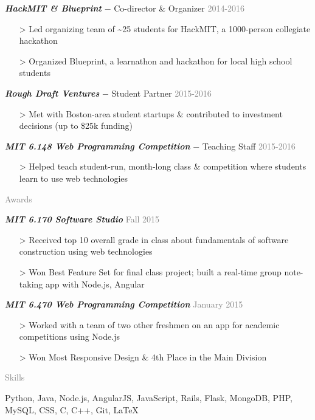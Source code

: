 \documentclass[11pt]{article}
\newcommand{\rsection}[1]{\vspace{1.5em}\textcolor{gray}{\Large \robotoslab #1}\vspace{0.5em}}
\newcommand{\bt}[1]{\textit{\textbf{#1}}} %
\newcommand{\gap}[0]{\vspace{0.4em}} %
\newcommand{\dash}[0]{ $-$ } %
\newcommand{\gray}[1]{\textcolor{gray}{#1}}
\newcommand{\e}[0]{> }
\begin{document}
\bt{HackMIT \& Blueprint}\dash Co-director \& Organizer \hfill \gray{2014-2016}

\begin{itemize}
\item[\e] Led organizing team of \textasciitilde 25 students for HackMIT, a 1000-person collegiate hackathon
\item[\e] Organized Blueprint, a learnathon and hackathon for local high school students
\end{itemize}

\gap

\bt{Rough Draft Ventures}\dash Student Partner \hfill \gray{2015-2016}

\begin{itemize}
\item[\e] Met with Boston-area student startups \& contributed to investment decisions (up to \$25k funding)
\end{itemize}

\gap

\bt{MIT 6.148 Web Programming Competition}\dash Teaching Staff \hfill \gray{2015-2016}

\begin{itemize}
\item[\e] Helped teach student-run, month-long class \& competition where students learn to use web technologies
\end{itemize}

\rsection{Awards}

\bt{MIT 6.170 Software Studio} \hfill \gray{Fall 2015}

\begin{itemize}
\item[\e] Received top 10 overall grade in class about fundamentals of software construction using web technologies
\item[\e] Won Best Feature Set for final class project; built a real-time group note-taking app with Node.js, Angular
\end{itemize}

\gap

\bt{MIT 6.470 Web Programming Competition} \hfill \gray{January 2015}

\begin{itemize}
\item[\e] Worked with a team of two other freshmen on an app for academic competitions using Node.js
\item[\e] Won Most Responsive Design \& 4th Place in the Main Division
\end{itemize}

\rsection{Skills}

Python, Java, Node.js, AngularJS, JavaScript, Rails, Flask, MongoDB, PHP, MySQL, CSS, C, C++, Git, {\selectfont\LaTeX}
\end{document}
